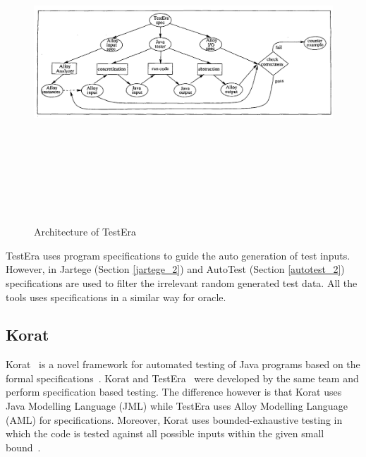 \begin{figure}[h]
	\centering
	\includegraphics[width=14.9cm, height=12cm]{chapter2/testera.png}
	\caption{Architecture of TestEra ~\cite{marinov2001testera}}
	\label{fig:testera}
\end{figure}


TestEra uses program specifications to guide the auto generation of test inputs. However, in Jartege (Section \ref{jartege_2}) and AutoTest (Section \ref{autotest_2}) specifications are used to filter the irrelevant random generated test data. All the tools uses specifications in a similar way for oracle. 



\subsection{Korat} %
Korat~\cite{boyapati2002korat} is a novel framework for automated testing of Java programs based on the formal specifications~\cite{chang1999structural}. Korat and TestEra~\cite{marinov2001testera} were developed by the same team and perform specification based testing. The difference however is that Korat uses Java Modelling Language (JML) while TestEra uses Alloy Modelling Language (AML) for specifications. Moreover, Korat uses bounded-exhaustive testing in which the code is tested against all possible inputs within the given small bound~\cite{khurshid2001checking}.

